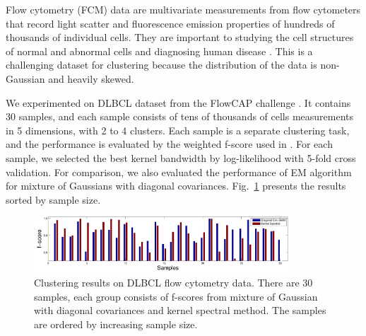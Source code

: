 
Flow cytometry (FCM) data are multivariate measurements from flow cytometers that record light scatter and fluorescence emission properties of hundreds of thousands of individual cells. They are important to studying the cell structures of normal and abnormal cells and diagnosing human disease \cite{cytometry_nature}. This is a challenging dataset for clustering because the distribution of the data is non-Gaussian and heavily skewed.

We experimented on DLBCL dataset from the FlowCAP challenge \cite{cytometry_nature}. It contains 30 samples, and each sample consists of tens of thousands of cells measurements in 5 dimensions, with 2 to 4 clusters. Each sample is a separate clustering task, and the performance is evaluated by the weighted f-score used in \cite{cytometry_nature}. For each sample, we selected the best kernel bandwidth by log-likelihood with 5-fold cross validation. For comparison, we also evaluated the performance of EM algorithm for mixture of Gaussians with diagonal covariances. Fig.~\ref{fig:real_data} presents the results sorted by sample size.


\begin{figure}
  \centering
  \includegraphics[width=0.85\textwidth]{../experiment/figure/paired_bar_chat} 
   \vspace{-3mm}
  \caption{Clustering results on DLBCL flow cytometry data. There are 30 samples, each group consists of f-scores from mixture of Gaussian with diagonal covariances and kernel spectral method. The samples are ordered by increasing sample size.}\label{fig:real_data}
  \vspace{-3mm}
\end{figure}

